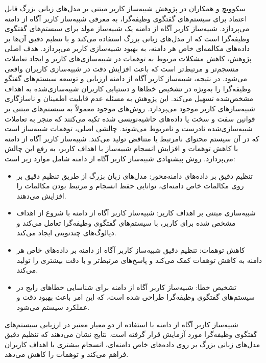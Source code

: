 \begin{enumerate}
سکوویچ و همکاران
\cite{sekulic2024reliable}
در پژوهش شبیه‌ساز کاربر مبتنی بر مدل‌های زبانی بزرگ قابل اعتماد برای سیستم‌های گفتگوی وظیفه‌گرا، به معرفی 
شبیه‌ساز کاربر آگاه از دامنه%
 می‌پردازد. شبیه‌ساز کاربر آگاه از دامنه یک شبیه‌ساز مولد برای سیستم‌های گفتگوی وظیفه‌گرا است که از مدل‌های زبانی بزرگ استفاده می‌کند و با تنظیم دقیق آن‌ها بر داده‌های مکالمه‌ای خاص هر دامنه، به بهبود شبیه‌سازی کاربر می‌پردازد. هدف اصلی پژوهش، کاهش مشکلات مربوط به توهمات در شبیه‌سازی‌های کاربر و ایجاد تعاملات منسجم‌تر و مرتبط‌تر است که باعث افزایش دقت در شبیه‌سازی کاربران واقعی می‌شود. در نتیجه، شبیه‌ساز کاربر آگاه از دامنه ارزیابی و توسعه سیستم‌های گفتگو وظیفه‌گرا را به‌ویژه در تشخیص خطاها و دستیابی کاربران شبیه‌سازی‌شده به اهداف مشخص‌شده تسهیل می‌کند.
\newline
این پژوهش به مسئله عدم قابلیت اطمینان و ناسازگاری شبیه‌سازهای کاربر موجود می‌پردازد. روش‌های موجود معمولاً به سیستم‌های مبتنی بر قوانین سفت و سخت یا داده‌های حاشیه‌نویسی شده تکیه می‌کنند که منجر به تعاملات شبیه‌سازی‌شده نادرست و نامربوط می‌شوند. چالشی اصلی، توهمات شبیه‌ساز است که در آن سیستم محتوای نامرتبط یا متناقض تولید می‌کند. شبیه‌ساز کاربر آگاه از دامنه با کاهش توهمات و افزایش انسجام شبیه‌ساز با اهداف کاربر، به رفع این چالش می‌پردازد.
\newline
روش پیشنهادی شبیه‌ساز کاربر آگاه از دامنه شامل موارد زیر است:
\begin{itemize}
\item
تنظیم دقیق بر داده‌های دامنه‌محور: مدل‌های زبان بزرگ از طریق تنظیم دقیق بر روی مکالمات خاص دامنه‌ای، توانایی حفظ انسجام و مرتبط بودن مکالمات را افزایش می‌دهند.
\item
شبیه‌سازی مبتنی بر اهداف کاربر: شبیه‌ساز کاربر آگاه از دامنه با شروع از اهداف مشخص شده برای کاربر، با سیستم‌های گفتگوی وظیفه‌گرا تعامل می‌کند و دیالوگ‌های چندنوبتی ایجاد می‌کند.
\item
کاهش توهمات: تنظیم دقیق شبیه‌ساز کاربر آگاه از دامنه بر داده‌های خاص هر دامنه به کاهش توهمات کمک می‌کند و پاسخ‌های مرتبط‌تر و با دقت بیشتری را تولید می‌کند.
\item
تشخیص خطا: شبیه‌ساز کاربر آگاه از دامنه برای شناسایی خطاهای رایج در سیستم‌های گفتگوی وظیفه‌گرا طراحی شده است، که این امر باعث بهبود دقت و عملکرد سیستم می‌شود.
\end{itemize}

شبیه‌ساز کاربر آگاه از دامنه با استفاده از دو معیار معتبر در ارزیابی سیستم‌های گفتگوی وظیفه‌گرا مورد آزمایش قرار گرفته است. نتایج نشان می‌دهند که تنظیم دقیق مدل‌های زبانی بزرگ بر روی داده‌های خاص دامنه‌ای، انسجام بیشتری با اهداف کاربران فراهم می‌کند و توهمات را کاهش می‌دهد.


\end{enumerate}
